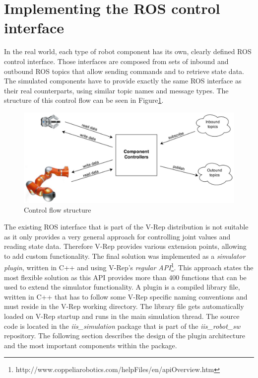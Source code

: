 \section{Implementing the ROS control interface}

In the real world, each type of robot component has its own, clearly defined ROS control interface. Those interfaces are composed from sets of inbound and outbound ROS topics that allow sending commands and to retrieve state data. The simulated components have to provide exactly the same ROS interface as their real counterparts, using similar topic names and message types. The structure of this control flow can be seen in Figure\ref{fig:control_flow}.

\begin{figure}[ht]
	\centering
  	\includegraphics[width=1.0\textwidth]{images/control_flow.jpg}
	\caption{Control flow structure}
	\label{fig:control_flow}
\end{figure}

The existing ROS interface that is part of the V-Rep distribution is not suitable as it only provides a very general approach for controlling joint values and reading state data. Therefore V-Rep provides various extension points, allowing to add custom functionality. The final solution was implemented as a \emph{simulator plugin}, written in C++ and using V-Rep's \emph{regular API}\footnote{http://www.coppeliarobotics.com/helpFiles/en/apiOverview.htm}. This approach states the most flexible solution as this API provides more than 400 functions that can be used to extend the simulator functionality. A plugin is a compiled library file, written in C++ that has to follow some V-Rep specific naming conventions and must reside in the V-Rep working directory. The library file gets automatically loaded on V-Rep startup and runs in the main simulation thread. The source code is located in the \emph{iis\_simulation} package that is part of the \emph{iis\_robot\_sw} repository. The following section describes the design of the plugin architecture and the most important components within the package.

